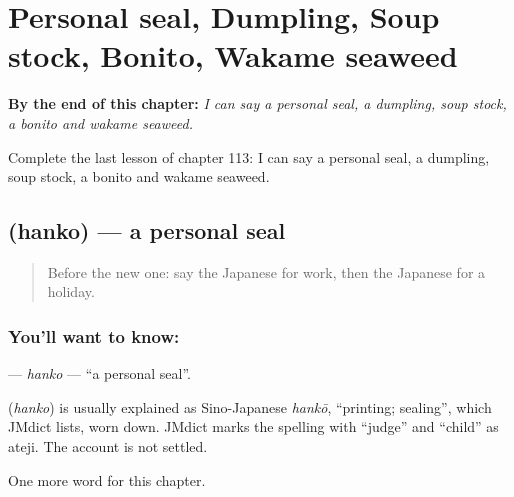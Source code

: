 
\chapter{Personal seal, Dumpling, Soup stock, Bonito, Wakame seaweed}
\label{ch:ja-personal-seal-dumpling-soup-stock-bonito-wakame-seaweed}

\begin{chapteropening}
\textbf{By the end of this chapter:} \emph{I can say a personal seal, a dumpling, soup stock, a bonito and wakame seaweed.}

Complete the last lesson of chapter 113: I can say a personal seal, a dumpling, soup stock, a bonito and wakame seaweed.
\end{chapteropening}

\section[\texorpdfstring{\ja{はんこ} (hanko)}{はんこ (hanko)}]{ (hanko) — a personal seal}

\label{lesson:JA-C113-hanko}



\begin{quote}
Before the new one: say the Japanese for work, then the Japanese for a holiday.
\end{quote}

\subsection*{You'll want to know: }
\textbf{} — \emph{hanko} — \textquotedblleft{}a personal seal\textquotedblright{}.

\begin{cousinweb}
\textbf{} (\emph{hanko}) is usually explained as Sino-Japanese \emph{hankō}, \textquotedblleft{}printing; sealing\textquotedblright{}, which JMdict lists, worn down. JMdict marks the spelling with \textquotedblleft{}judge\textquotedblright{} and \textquotedblleft{}child\textquotedblright{} as ateji. The account is not settled.
\end{cousinweb}

\begin{grammarlens}[title={What you've built}]
One more word for this chapter.
\end{grammarlens}

